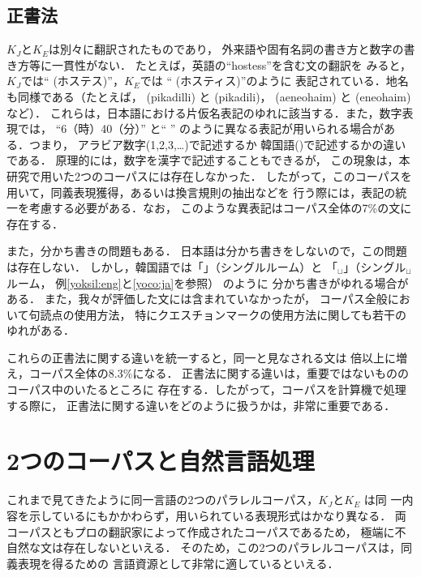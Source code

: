 \subsection{正書法}
\label{sec:orthography}

$K_J$と$K_E$は別々に翻訳されたものであり，
外来語や固有名詞の書き方と数字の書き方等に一貫性がない．
たとえば，英語の``hostess''を含む文の翻訳を
みると，$K_J$では`` (ホステス)''，$K_E$では
`` (ホスティス)''のように
表記されている．地名も同様である（たとえば， (pikadilli)
と  (pikadili)， (aeneohaim) と
 (eneohaim)など）．
これらは，日本語における片仮名表記のゆれに該当する．また，数字表現では，
``6（時）40（分）'' と`` ''
のように異なる表記が用いられる場合がある．つまり，
アラビア数字(1,2,3,\ldots)で記述するか
韓国語()で記述するかの違いである．
原理的には，数字を漢字で記述することもできるが，
この現象は，本研究で用いた2つのコーパスには存在しなかった．
したがって，このコーパスを用いて，同義表現獲得，あるいは換言規則の抽出などを
行う際には，表記の統一を考慮する必要がある．なお，
このような異表記はコーパス全体の7\%の文に存在する．

また，分かち書きの問題もある．
日本語は分かち書きをしないので，この問題は存在しない．
しかし，韓国語では「」（シングルルーム）と
「$_\sqcup$」（シングル$_\sqcup$ルーム，
例\ref{yoksil:eng}と\ref{yoco:ja}を参照）
のように
分かち書きがゆれる場合がある．
また，我々が評価した文には含まれていなかったが，
コーパス全般において句読点の使用方法，
特にクエスチョンマークの使用方法に関しても若干のゆれがある．

これらの正書法に関する違いを統一すると，同一と見なされる文は
倍以上に増え，コーパス全体の8.3\%になる．
正書法に関する違いは，重要ではないもののコーパス中のいたるところに
存在する．したがって，コーパスを計算機で処理する際に，
正書法に関する違いをどのように扱うかは，非常に重要である．

\section{2つのコーパスと自然言語処理}
\label{sec:nlp}
これまで見てきたように同一言語の2つのパラレルコーパス，$K_J$と$K_E$ は同
一内容を示しているにもかかわらず，用いられている表現形式はかなり異なる．
両コーパスともプロの翻訳家によって作成されたコーパスであるため，
極端に不自然な文は存在しないといえる．
そのため，この2つのパラレルコーパスは，同義表現を得るための
言語資源として非常に適しているといえる．

